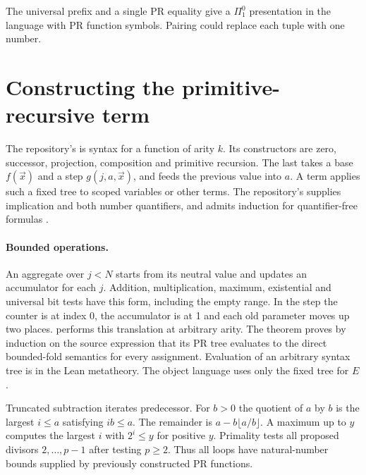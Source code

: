 \documentclass[11pt]{article}
\begin{document}
The universal prefix and a single PR equality give a \(\Pi^0_1\) presentation in the language with PR function symbols. Pairing could replace each tuple with one number.
\newpage

\newpage
\newpage

\newpage
\newpage\section{Constructing the primitive-recursive term}\label{sec:kernel}
The repository's  is syntax for a function of arity \(k\). Its constructors are zero, successor, projection, composition and primitive recursion. The last takes a base \(f(\vec x)\) and a step \(g(j,a,\vec x)\), and feeds the previous value into \(a\). A term applies such a fixed tree to scoped variables or other terms. The repository's  supplies implication and both number quantifiers, and  admits induction for quantifier-free formulas \cite{repo}.

\paragraph{Bounded operations.}
An aggregate over \(j<N\) starts from its neutral value and updates an accumulator for each \(j\). Addition, multiplication, maximum, existential and universal bit tests have this form, including the empty range. In the step the counter is at index 0, the accumulator is at 1 and each old parameter moves up two places.  performs this translation at arbitrary arity. The theorem  proves by induction on the source expression that its PR tree evaluates to the direct bounded-fold semantics for every assignment. Evaluation of an arbitrary syntax tree is in the Lean metatheory. The object language uses only the fixed tree for \(E\).

Truncated subtraction iterates predecessor. For \(b>0\) the quotient of \(a\) by \(b\) is the largest \(i\le a\) satisfying \(ib\le a\). The remainder is \(a-b\lfloor a/b\rfloor\). A maximum up to \(y\) computes the largest \(i\) with \(2^i\le y\) for positive \(y\). Primality tests all proposed divisors \(2,\ldots,p-1\) after testing \(p\ge2\). Thus all loops have natural-number bounds supplied by previously constructed PR functions.
\end{document}
